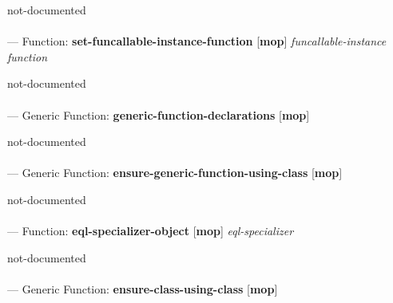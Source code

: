 \begin{adjustwidth}{5em}{5em}
not-documented
\end{adjustwidth}

\paragraph{}
\label{MOP:SET-FUNCALLABLE-INSTANCE-FUNCTION}
--- Function: \textbf{set-funcallable-instance-function} [\textbf{mop}] \textit{funcallable-instance function}

\begin{adjustwidth}{5em}{5em}
not-documented
\end{adjustwidth}

\paragraph{}
\label{MOP:GENERIC-FUNCTION-DECLARATIONS}
--- Generic Function: \textbf{generic-function-declarations} [\textbf{mop}] \textit{}

\begin{adjustwidth}{5em}{5em}
not-documented
\end{adjustwidth}

\paragraph{}
\label{MOP:ENSURE-GENERIC-FUNCTION-USING-CLASS}
--- Generic Function: \textbf{ensure-generic-function-using-class} [\textbf{mop}] \textit{}

\begin{adjustwidth}{5em}{5em}
not-documented
\end{adjustwidth}

\paragraph{}
\label{MOP:EQL-SPECIALIZER-OBJECT}
--- Function: \textbf{eql-specializer-object} [\textbf{mop}] \textit{eql-specializer}

\begin{adjustwidth}{5em}{5em}
not-documented
\end{adjustwidth}

\paragraph{}
\label{MOP:ENSURE-CLASS-USING-CLASS}
--- Generic Function: \textbf{ensure-class-using-class} [\textbf{mop}] \textit{}

